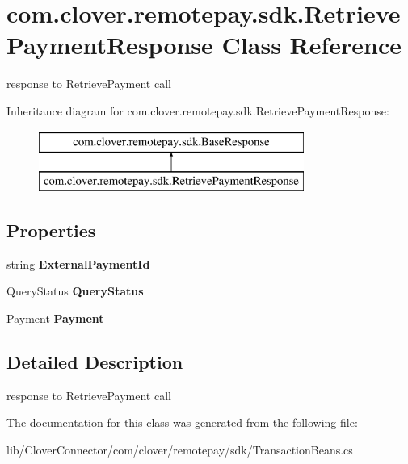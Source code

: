 \hypertarget{classcom_1_1clover_1_1remotepay_1_1sdk_1_1_retrieve_payment_response}{}\section{com.\+clover.\+remotepay.\+sdk.\+Retrieve\+Payment\+Response Class Reference}
\label{classcom_1_1clover_1_1remotepay_1_1sdk_1_1_retrieve_payment_response}


response to Retrieve\+Payment call  


Inheritance diagram for com.\+clover.\+remotepay.\+sdk.\+Retrieve\+Payment\+Response\+:\begin{figure}[H]
\begin{center}
\leavevmode
\includegraphics[height=2.000000cm]{classcom_1_1clover_1_1remotepay_1_1sdk_1_1_retrieve_payment_response}
\end{center}
\end{figure}
\subsection*{Properties}
\begin{DoxyCompactItemize}
\item 
\mbox{\label{classcom_1_1clover_1_1remotepay_1_1sdk_1_1_retrieve_payment_response_aa2fab33f9e57b6273ee688decf6f871d}} 
string {\bfseries External\+Payment\+Id}
\item 
\mbox{\label{classcom_1_1clover_1_1remotepay_1_1sdk_1_1_retrieve_payment_response_ad3ad4b7c6f84ce21594b187cfab54dc8}} 
Query\+Status {\bfseries Query\+Status}
\item 
\mbox{\label{classcom_1_1clover_1_1remotepay_1_1sdk_1_1_retrieve_payment_response_aa6333edc6d00e11ca5312a34d2fe1003}} 
\hyperlink{classcom_1_1clover_1_1sdk_1_1v3_1_1payments_1_1_payment}{Payment} {\bfseries Payment}
\end{DoxyCompactItemize}


\subsection{Detailed Description}
response to Retrieve\+Payment call 



The documentation for this class was generated from the following file\+:\begin{DoxyCompactItemize}
\item 
lib/\+Clover\+Connector/com/clover/remotepay/sdk/Transaction\+Beans.\+cs\end{DoxyCompactItemize}
